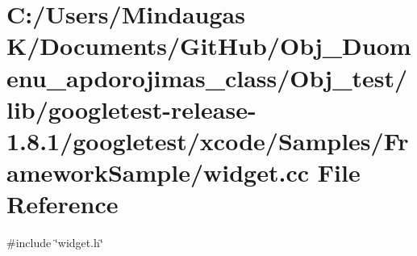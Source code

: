 \hypertarget{_obj__test_2lib_2googletest-release-1_88_81_2googletest_2xcode_2_samples_2_framework_sample_2widget_8cc}{}\section{C\+:/\+Users/\+Mindaugas K/\+Documents/\+Git\+Hub/\+Obj\+\_\+\+Duomenu\+\_\+apdorojimas\+\_\+class/\+Obj\+\_\+test/lib/googletest-\/release-\/1.8.1/googletest/xcode/\+Samples/\+Framework\+Sample/widget.cc File Reference}
\label{_obj__test_2lib_2googletest-release-1_88_81_2googletest_2xcode_2_samples_2_framework_sample_2widget_8cc}
{\ttfamily \#include \char`\"{}widget.\+h\char`\"{}}\newline
